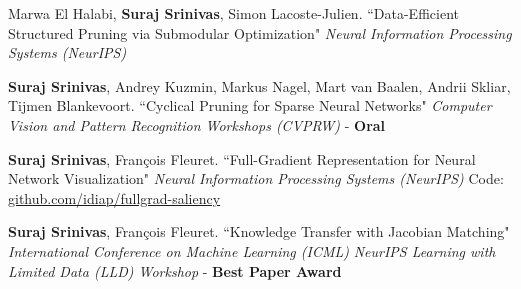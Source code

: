 \documentclass[11pt,a4paper,sans,english]{moderncv}        %
\begin{document}
 {Marwa El Halabi, \textbf{Suraj Srinivas}, Simon Lacoste-Julien.
\newline ``Data-Efficient Structured Pruning via Submodular Optimization" \newline \textit{Neural Information Processing Systems (NeurIPS)}}

\vspace*{0.25em}
 {\textbf{Suraj Srinivas}, Andrey Kuzmin, Markus Nagel, Mart van Baalen, \newline Andrii Skliar, Tijmen Blankevoort. \newline ``Cyclical Pruning for Sparse Neural Networks" 
\newline \textit{Computer Vision and Pattern Recognition Workshops (CVPRW)} - \textbf{Oral}}

\vspace*{0.25em}
\vspace*{0.25em}

 {\textbf{Suraj Srinivas}, Fran\c{c}ois Fleuret. \newline ``Full-Gradient Representation
for Neural Network Visualization" \newline \textit{Neural Information Processing Systems (NeurIPS)}
\newline Code: \href{https://github.com/idiap/fullgrad-saliency}{github.com/idiap/fullgrad-saliency}
}
\vspace*{0.25em}

 {\textbf{Suraj Srinivas}, Fran\c{c}ois Fleuret.
\newline ``Knowledge Transfer with Jacobian Matching" 
\newline \textit{International Conference on Machine Learning (ICML)}
\newline \textit{NeurIPS Learning with Limited Data (LLD) Workshop} - \textbf{Best Paper Award}
}
\vspace*{0.25em}

\end{document}
